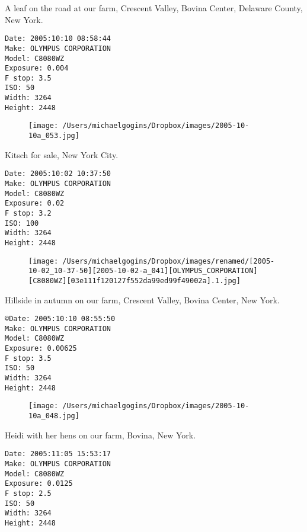 \documentclass[11pt,letter,DIV=14,paper=landscape]{scrbook}
\begin{document}
\clearpage
\noindent A leaf on the road at our farm, Crescent Valley, Bovina Center, Delaware County, New York.
\noindent
\begin{lstlisting}
Date: 2005:10:10 08:58:44
Make: OLYMPUS CORPORATION
Model: C8080WZ
Exposure: 0.004
F stop: 3.5
ISO: 50
Width: 3264
Height: 2448
\end{lstlisting}
\clearpage

\begin{figure}
\texttt{[image: /Users/michaelgogins/Dropbox/images/2005-10-10a\_053.jpg]}
\end{figure}
    
\clearpage
\noindent Kitsch for sale, New York City.
\noindent
\begin{lstlisting}
Date: 2005:10:02 10:37:50
Make: OLYMPUS CORPORATION
Model: C8080WZ
Exposure: 0.02
F stop: 3.2
ISO: 100
Width: 3264
Height: 2448
\end{lstlisting}
\clearpage

\begin{figure}
\texttt{[image: /Users/michaelgogins/Dropbox/images/renamed/[2005-10-02\_10-37-50][2005-10-02-a\_041][OLYMPUS\_CORPORATION][C8080WZ][03e111f120127f552da99ed99f49002a].1.jpg]}
\end{figure}
    
\clearpage
\noindent Hillside in autumn on our farm, Crescent Valley, Bovina Center, New York.
\noindent
\begin{lstlisting}
©Date: 2005:10:10 08:55:50
Make: OLYMPUS CORPORATION
Model: C8080WZ
Exposure: 0.00625
F stop: 3.5
ISO: 50
Width: 3264
Height: 2448
\end{lstlisting}
\clearpage

\begin{figure}
\texttt{[image: /Users/michaelgogins/Dropbox/images/2005-10-10a\_048.jpg]}
\end{figure}
    
\clearpage
\noindent Heidi with her hens on our farm, Bovina, New York.
\noindent
\begin{lstlisting}
Date: 2005:11:05 15:53:17
Make: OLYMPUS CORPORATION
Model: C8080WZ
Exposure: 0.0125
F stop: 2.5
ISO: 50
Width: 3264
Height: 2448
\end{lstlisting}
\clearpage
\end{document}
